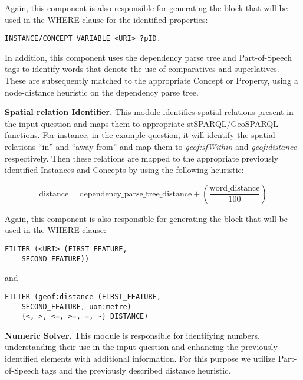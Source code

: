 Again, this component is also responsible for generating the block that will be used in the WHERE clause for the identified properties:

\begin{lstlisting}[language=SPARQL]
INSTANCE/CONCEPT_VARIABLE <URI> ?pID.
\end{lstlisting}

In addition, this component uses the dependency parse tree and Part-of-Speech tags to identify words that denote the use of comparatives and superlatives. These are subsequently matched to the appropriate Concept or Property, using a node-distance heuristic on the dependency parse tree.

\textbf{Spatial relation Identifier.} This module identifies spatial relations present in the input question and maps them to appropriate stSPARQL/GeoSPARQL functions. For instance, in the example question, it will identify the spatial relations ``in'' and ``away from'' and map them to \textit{geof:sfWithin} and \textit{geof:distance} respectively. Then these relations are mapped to the appropriate previously identified Instances and Concepts by using the following heuristic: 

\[
\text{distance} = \text{dependency\_parse\_tree\_distance} + \left(\frac{\text{word\_distance}}{100}\right)
\]

Again, this component is also responsible for generating the block that will be used in the WHERE clause:

\begin{lstlisting}[language=SPARQL]
FILTER (<URI> (FIRST_FEATURE, 
    SECOND_FEATURE))
\end{lstlisting}
and
\begin{lstlisting}[language=SPARQL]
FILTER (geof:distance (FIRST_FEATURE, 
    SECOND_FEATURE, uom:metre) 
    {<, >, <=, >=, =, ~} DISTANCE)
\end{lstlisting}

\textbf{Numeric Solver.} This module is responsible for identifying numbers, understanding their use in the input question and enhancing the previously identified elements with additional information. For this purpose we utilize Part-of-Speech tags and the previously described distance heuristic.

